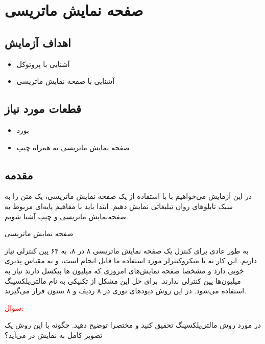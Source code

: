 \section{صفحه نمایش ماتریسی}

\subsection{اهداف آزمایش}
\begin{itemize}
    \item آشنایی با پروتوکل 
    \item آشنایی با صفحه نمایش ماتریسی
\end{itemize}
\subsection{قطعات مورد نیاز}

\begin{itemize}
    \item بورد 
    \item صفحه نمایش ماتریسی به همراه چیپ 
\end{itemize}
\subsection{مقدمه}

در این آزمایش می‌خواهیم با با استفاده از یک صفحه نمایش ماتریسی، یک متن را به سبک تابلوهای روان تبلیغاتی نمایش دهیم. ابتدا باید با مفاهیم پایه‌ای مربوط به صفحه‌نمایش ماتریسی و چیپ  آشنا شویم.

\newline
\begin{nas} صفحه نمایش ماتریسی\end{nas}
\newline

به طور عادی برای کنترل یک صفحه نمایش ماتریسی ۸ در ۸، به ۶۴ پین کنترلی نیاز داریم. این کار نه با میکروکنترلر مورد استفاده ما قابل انجام است، و نه مقیاس پذیری خوبی دارد و مشخصا صفحه نمایش‌های امروزی که میلیون ها پیکسل دارند نیاز به میلیون‌ها پین کنترلی ندارند. برای حل این مشکل از تکنیکی به نام مالتی‌پلکسینگ استفاده می‌شود. در این روش دیودهای نوری در ۸ ردیف و ۸ ستون قرار می‌گیرند.
\newline
\textcolor{red}{\begin{nas}سوال: \end{nas}}
در مورد روش مالتی‌پلکسینگ تحقیق کنید و مختصرا توضیح دهید. چگونه با این روش یک تصویر کامل به نمایش در می‌آید؟

